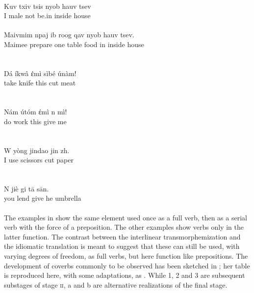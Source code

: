 \ea\label{ex:E85}
\\
 \ea
 \gll   Kuv  txiv  tsis  nyob  hauv  tsev\\
   I  male  not  be.in  inside  house\\
\\
\ex
\gll  Maivmim  npaj  ib  roog  qav  nyob  hauv  tsev.\\
Maimee  prepare  one  table  food  in  inside  house\\
\\
\z
\z
\noindent \ea\label{ex:E86}
\\
\gll Dá  íkwâ  έmì  sìbé  únàm!\\
 take  knife  this  cut  meat\\
\\
\z
\noindent \ea\label{ex:E87}
\\
\gll   Nám  útóm  έmì  n  mì!\\
 do  work  this  give  me\\
\\
\z
\noindent \ea\label{ex:E88}
\langinfo{\LangMand}{}{}\\
\gll   W  yòng  jindao  jin  zh.\\
 I  use  scissors  cut  paper\\
\\
\z
\noindent \ea\label{ex:E89}
\langinfo{\LangMand}{}{}\\
\gll  N  jiè  gi  t\=a  s\=an.\\
 you  lend  give  he  umbrella\\
\\
\z
\noindent The examples in  show the same element used once as a full verb, then as a serial verb with the force of a preposition. The other examples show verbs only in the latter function. The contrast between the interlinear transmorphemization and the idiomatic translation is meant to suggest that these can still be used, with varying degrees of freedom, as full verbs, but here function like prepositions. The development of coverbs commonly to be observed has been sketched in \citealt[3]{Clark1979}; her table is reproduced here, with some adaptations, as . While 1, 2 and 3 are subsequent substages of stage \textsc{ii}, a and b are alternative realizations of the final stage.

